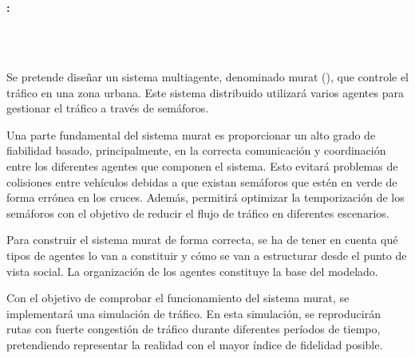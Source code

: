 \chapter*{}

\thispagestyle{empty}

\begin{center}
   {\large\bfseries \myTitleShort: \myTitle}
\end{center}

\begin{center}
    {\myName}
\end{center}

\\

    \vspace{0.7cm}

\\

Se pretende diseñar un sistema multiagente, denominado \acrshort{murat} (\myTitle), que controle el tráfico en una zona urbana. Este sistema distribuido utilizará varios agentes para gestionar el tráfico a través de semáforos. 

Una parte fundamental del sistema \acrshort{murat} es proporcionar un alto grado de fiabilidad basado, principalmente, en la correcta comunicación y coordinación entre los diferentes agentes que componen el sistema. Esto evitará problemas de colisiones entre vehículos debidas a que existan semáforos que estén en verde de forma errónea en los cruces. Además, permitirá optimizar la temporización de los semáforos con el objetivo de reducir el flujo de tráfico en diferentes escenarios.

Para construir el sistema \acrshort{murat} de forma correcta, se ha de tener en cuenta qué tipos de agentes lo van a constituir y cómo se van a estructurar desde el punto de vista social. La organización de los agentes constituye la base del modelado.

Con el objetivo de comprobar el funcionamiento del sistema \acrshort{murat}, se implementará una simulación de tráfico. En esta simulación, se reproducirán rutas con fuerte congestión de tráfico durante diferentes períodos de tiempo, pretendiendo representar la realidad con el mayor índice de fidelidad posible.

